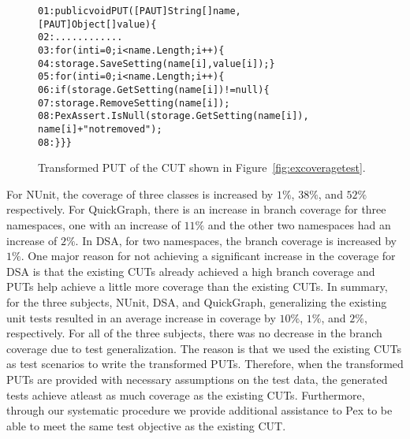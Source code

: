 \begin{figure}[t]
\begin{CodeOut}
\begin{alltt}
01: public void PUT([PAUT]String[] name, 
\hspace*{1.7in}[PAUT]Object[] value) \{
02: \hspace*{0.07in}............
03: \hspace*{0.07in}for (int i = 0; i < name.Length; i++) \{
04: \hspace*{0.22in}storage.SaveSetting(name[i], value[i]); \}
05: \hspace*{0.07in}for (int i = 0; i < name.Length; i++) \{
06: \hspace*{0.17in}if (storage.GetSetting(name[i]) != null) \{
07: \hspace*{0.3in}storage.RemoveSetting(name[i]);
08: \hspace*{0.3in}PexAssert.IsNull(storage.GetSetting(name[i]), 
\hspace*{1.5in}name[i] + " not removed"); 
08: \hspace*{0.1in}\}\}\}
\end{alltt}
\end{CodeOut} \vspace*{-4ex}
\caption{Transformed PUT of the CUT shown in Figure~\ref{fig:excoveragetest}.} \vspace*{-1.5ex}
\label{fig:excoveragePUT}%
\end{figure}

For NUnit, the coverage of three classes is increased by $1\%$, $38\%$, and $52\%$ respectively. For QuickGraph, there is an increase in branch coverage for three namespaces, one with an increase of $11\%$ and the other two namespaces had an increase of $2\%$. In DSA, for two namespaces, the branch coverage is increased  by $1\%$. One major reason for not achieving a significant increase in the coverage for DSA is that the existing CUTs already achieved a high branch coverage and PUTs help achieve a little more coverage than the existing CUTs. In summary, for the three subjects, NUnit, DSA, and QuickGraph, generalizing the existing unit tests resulted in an average increase in coverage by $10\%$, $1\%$, and $2\%$, respectively. For all of the three subjects, there was no decrease in the branch coverage due to test generalization. The reason is that we used the existing CUTs as test scenarios to write the transformed PUTs. Therefore, when the transformed PUTs are provided with necessary assumptions on the test data, the generated tests achieve atleast as much coverage as the existing CUTs. Furthermore, through our systematic procedure we provide additional assistance to Pex to be able to meet the same test objective as the existing CUT.


